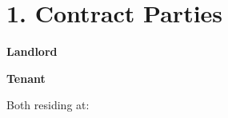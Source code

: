\section*{1. Contract Parties}

\textbf{Landlord}\\
\ContractLandlordsEN

\vspace{0.5cm}

\textbf{Tenant}\\
\ContractTenantsEN

Both residing at: \Propaddress
